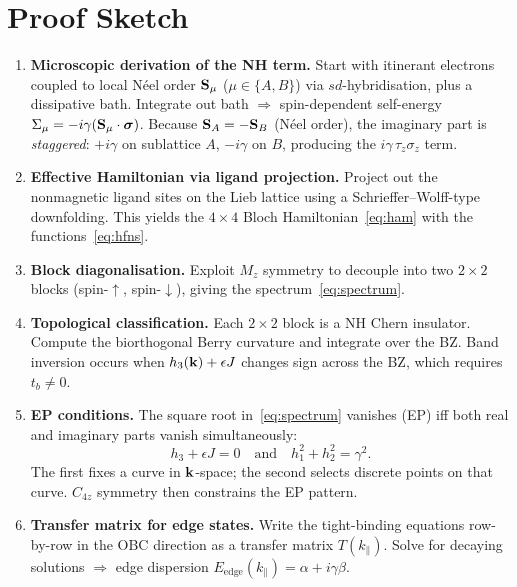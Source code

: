 \documentclass[11pt,a4paper]{article}
\begin{document}
\section{Proof Sketch}

\begin{enumerate}
  \item \textbf{Microscopic derivation of the NH term.}
    Start with itinerant electrons coupled to local N\'eel order $\vb{S}_\mu$ ($\mu\in\{A,B\}$) via $sd$-hybridisation, plus a dissipative bath.  Integrate out bath $\Rightarrow$ spin-dependent self-energy $\Sigma_\mu = -i\gamma(\vb{S}_\mu\cdot\boldsymbol{\sigma})$.  Because $\vb{S}_A = -\vb{S}_B$ (N\'eel order), the imaginary part is \emph{staggered}: $+i\gamma$ on sublattice $A$, $-i\gamma$ on $B$, producing the $i\gamma\,\tau_z\sigma_z$ term.

  \item \textbf{Effective Hamiltonian via ligand projection.}
    Project out the nonmagnetic ligand sites on the Lieb lattice using a Schrieffer--Wolff-type downfolding.  This yields the $4\times4$ Bloch Hamiltonian~\eqref{eq:ham} with the functions~\eqref{eq:hfns}.

  \item \textbf{Block diagonalisation.}
    Exploit $M_z$ symmetry to decouple into two $2\times2$ blocks (spin-$\uparrow$, spin-$\downarrow$), giving the spectrum~\eqref{eq:spectrum}.

  \item \textbf{Topological classification.}
    Each $2\times2$ block is a NH Chern insulator.  Compute the biorthogonal Berry curvature and integrate over the BZ.  Band inversion occurs when $h_3(\vb{k}) + \epsilon J$ changes sign across the BZ, which requires $t_b\neq 0$.

  \item \textbf{EP conditions.}
    The square root in~\eqref{eq:spectrum} vanishes (EP) iff both real and imaginary parts vanish simultaneously:
    \[
      h_3 + \epsilon J = 0 \quad\text{and}\quad h_1^2 + h_2^2 = \gamma^2.
    \]
    The first fixes a curve in $\vb{k}$-space; the second selects discrete points on that curve.  $C_{4z}$ symmetry then constrains the EP pattern.

  \item \textbf{Transfer matrix for edge states.}
    Write the tight-binding equations row-by-row in the OBC direction as a transfer matrix $T(k_\parallel)$.  Solve for decaying solutions $\Rightarrow$ edge dispersion $E_{\text{edge}}(k_\parallel) = \alpha + i\gamma\beta$.


\end{enumerate}
\end{document}
